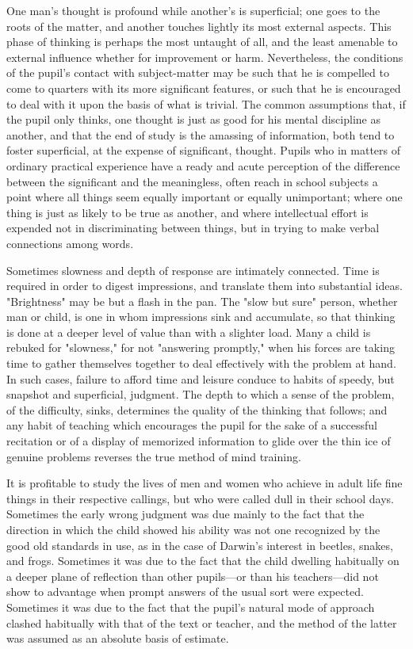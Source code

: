 \documentclass[letterpaper]{book}
\begin{document}
One man's thought is profound while another's is superficial; one goes
to the roots of the matter, and another touches lightly its most
external aspects. This phase of thinking is perhaps the most untaught of
all, and the least amenable to external influence whether for
improvement or harm. Nevertheless, the conditions of the pupil's contact
with subject-matter may be such that he is compelled to come to quarters
with its more significant features, or such that he is encouraged to
deal with it upon the basis of what is trivial. The common assumptions
that, if the pupil only thinks, one thought is just as good for his
mental discipline as another, and that the end of study is the amassing
of information, both tend to foster superficial, at the expense of
significant, thought. Pupils who in matters of ordinary practical
experience have a ready and acute perception of the difference between
the significant and the meaningless, often reach in school subjects a
point where all things seem equally important or equally unimportant;
where one thing is just as likely to be true as another, and where
intellectual effort is expended not in discriminating between things,
but in trying to make verbal connections among words.


Sometimes slowness and depth of response are intimately connected. Time
is required in order to digest impressions, and translate them into
substantial ideas. "Brightness" may be but a flash in the pan. The "slow
but sure" person, whether man or child, is one in whom impressions sink
and accumulate, so that thinking is
done
at a deeper level of value than with a slighter load. Many a child is
rebuked for "slowness," for not "answering promptly," when his forces
are taking time to gather themselves together to deal effectively with
the problem at hand. In such cases, failure to afford time and leisure
conduce to habits of speedy, but snapshot and superficial, judgment. The
depth to which a sense of the problem, of the difficulty, sinks,
determines the quality of the thinking that follows; and any habit of
teaching which encourages the pupil for the sake of a successful
recitation or of a display of memorized information to glide over the
thin ice of genuine problems reverses the true method of mind training.


It is profitable to study the lives of men and women who achieve in
adult life fine things in their respective callings, but who were called
dull in their school days. Sometimes the early wrong judgment was due
mainly to the fact that the direction in which the child showed his
ability was not one recognized by the good old standards in use, as in
the case of Darwin's interest in beetles, snakes, and frogs. Sometimes
it was due to the fact that the child dwelling habitually on a deeper
plane of reflection than other pupils---or than his teachers---did not
show to advantage when prompt answers of the usual sort were expected.
Sometimes it was due to the fact that the pupil's natural mode of
approach clashed habitually with that of the text or teacher, and the
method of the latter was assumed as an absolute basis of estimate.
\end{document}
